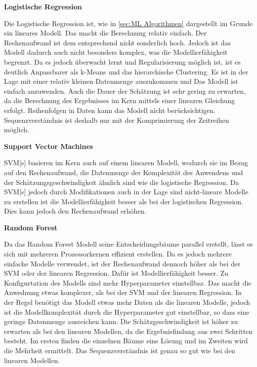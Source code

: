 \textbf{Logistische Regression}\par
Die Logistische Regression ist, wie in \ref{sec:ML Algorithmen} dargestellt im Grunde ein lineares Modell. Das macht die Berechnung relativ einfach. Der Rechenaufwand ist dem entsprechend nicht sonderlich hoch. Jedoch ist das Modell dadurch auch nicht besonders komplex, was die Modellierfähigkeit begrenzt. Da es jedoch überwacht lernt und Regularisierung möglich ist, ist es deutlich Anpassbarer als k-Means und das hierarchische Clustering. Es ist in der Lage mit einer relativ kleinen Datenmenge auszukommen und Das Modell ist einfach anzuwenden. Auch die Dauer der Schätzung ist sehr gering zu erwarten, da die Berechnung des Ergebnisses im Kern mittels einer linearen Gleichung erfolgt. Reihenfolgen in Daten kann das Modell nicht berücksichtigen. Sequenzverständnis ist deshalb nur mit der Komprimierung der Zeitreihen möglich.\dubpar

\textbf{Support Vector Machines}\par
\acrshort{SVM}[s] basieren im Kern auch auf einem linearen Modell, wodurch sie im Bezug auf den Rechenaufwand, die Datenmenge der Komplexität des Anwendens und der Schätzungsgeschwindigkeit ähnlich sind wie die logistische Regression. Da \acrshort{SVM}[s] jedoch durch Modifikationen auch in der Lage sind nicht-lineare Modelle zu erstellen ist die Modellierfähigkeit besser als bei der logistischen Regression. Dies kann jedoch den Rechenaufwand erhöhen.\dubpar

\textbf{Random Forest}\par
Da das Random Forest Modell seine Entscheidungsbäume parallel erstellt, lässt es sich mit mehreren Prozessorkernen effizient erstellen. Da es jedoch mehrere einfache Modelle verwendet, ist der Rechenaufwand dennoch höher als bei der \acrshort{SVM} oder der linearen Regression. Dafür ist Modellierfähigkeit besser. Zu Konfigurtation des Modells sind mehr Hyperparameter einstellbar. Das macht die Anwednung etwas komplexer, als bei der SVM und der linearen Regression. In der Regel benötigt das Modell etwas mehr Daten als die linearen Modelle, jedoch ist die Modellkomplexität durch die Hyperparameter gut einstellbar, so dass eine geringe Datenmenge ausreichen kann. Die Schätzgeschwindigkeit ist höher zu erwarten als bei den linearen Modellen, da die Ergebnisfindung aus zwei Schritten besteht. Im ersten finden die einzelnen Bäume eine Lösung und im Zweiten wird die Mehrheit ermittelt. Das Sequenzverständnis ist genau so gut wie bei den linearen Modellen.\dubpar

